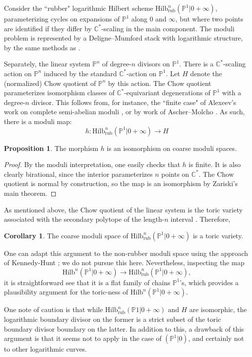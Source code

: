 \documentclass[10.5pt]{amsart}
\theoremstyle{definition}
\theoremstyle{definition}
\theoremstyle{definition}
\theoremstyle{definition}
\newtheorem{corollary}[theorem]{Corollary}
\newtheorem{proposition}[theorem]{Proposition}
\newcommand{\PP}{\mathbb{P}}
\newcommand{\Hilb}{\mathrm{Hilb}}
\begin{document}
Consider the ``rubber" logarithmic Hilbert scheme $\Hilb^n_{\mathrm{rub}}(\mathbb{P}^1|0+\infty)$, parameterizing cycles on expansions of $\mathbb{P}^1$ along $0$ and $\infty$, but where two points are identified if they differ by $\mathbb{C}^*$-scaling in the main component. The moduli problem is represented by a Deligne--Mumford stack with logarithmic structure, by the same methods as \cite{MR20}.

Separately, the linear system $\mathbb{P}^n$ of degree-$n$ divisors on $\mathbb{P}^1$. There is a $\mathbb{C}^*$-scaling action on $\mathbb{P}^n$ induced by the standard $\mathbb{C}^*$-action on $\PP^1$. Let $H$ denote the (normalized) Chow quotient of $\mathbb{P}^n$ by this action. The Chow quotient parameterizes isomorphism classes of $\mathbb{C}^*$-equivariant degenerations of $\mathbb{P}^1$ with a degree-$n$ divisor. This follows from, for instance, the ``finite case" of Alexeev's work on complete semi-abelian moduli \cite[§2.10-12]{Alexeev2002}, or by work of Ascher--Molcho \cite{AM16}. As such, there is a moduli map:
	\[h:\Hilb^n_{\mathrm{rub}}(\mathbb{P}^1|0+\infty) \to H\]
\begin{proposition} The morphism $h$ is an isomorphism on coarse moduli spaces. \end{proposition}

\begin{proof} By the moduli interpretation, one easily checks that $h$ is finite. It is also clearly birational, since the interior parameterizes $n$ points on $\mathbb{C}^*$. The Chow quotient is normal by construction, so the map is an isomorphism by Zariski's main theorem. \end{proof}

As mentioned above, the Chow quotient of the linear system is the toric variety associated with the secondary polytope of the length-$n$ interval \cite{KSZ91}. Therefore,

\begin{corollary} The coarse moduli space of $\Hilb^n_{\mathrm{rub}}(\mathbb{P}^1|0+\infty)$ is a toric variety. \end{corollary}

One can adapt this argument to the non-rubber moduli space using the approach of Kennedy-Hunt \cite{kh21}; we do not pursue this here. Nevertheless, inspecting the map \[\Hilb^n(\mathbb{P}^1|0+\infty) \to \Hilb^n_{\mathrm{rub}}(\mathbb{P}^1|0+\infty),\]it is straightforward see that it is a flat family of chains $\mathbb{P}^1$'s, which provides a plausibility argument for the toric-ness of $\Hilb^n(\mathbb{P}^1|0+\infty)$. 

One note of caution is that while $\Hilb^n_{\mathrm{rub}}(\PP1|0+\infty)$ and $H$ are isomorphic, the logarithmic boundary divisor on the former is a strict subset of the toric boundary divisor boundary on the latter. In addition to this, a drawback of this argument is that it seems not to apply in the case of $(\PP^1|0)$, and certainly not to other logarithmic curves.




\,
\end{document}
